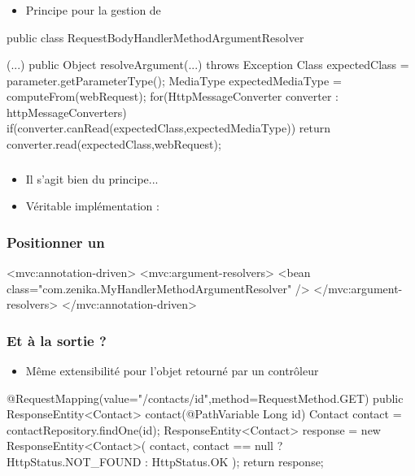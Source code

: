 \begin{frame}[fragile]
 \frametitle{}
 \begin{itemize}
  \item Principe pour la gestion de 
 \end{itemize}
 \begin{javacode}
public class RequestBodyHandlerMethodArgumentResolver {
  (...)
  public Object resolveArgument(...) throws Exception {
    Class expectedClass = parameter.getParameterType();
    MediaType expectedMediaType = computeFrom(webRequest);
    for(HttpMessageConverter converter : httpMessageConverters) {
      if(converter.canRead(expectedClass,expectedMediaType)) {
        return converter.read(expectedClass,webRequest);
      }      
    }
  }

}
 \end{javacode}

\end{frame}

\begin{frame}[fragile]
 \frametitle{}
 \begin{itemize}
  \item Il s'agit bien du principe...
  \item Véritable implémentation : 
 \end{itemize}
\end{frame}

\begin{frame}[fragile]
 \frametitle{Positionner un }
 
 \begin{xmlcode}
<mvc:annotation-driven>
  <mvc:argument-resolvers>
    <bean class="com.zenika.MyHandlerMethodArgumentResolver" />
  </mvc:argument-resolvers>
</mvc:annotation-driven>
 \end{xmlcode}

\end{frame}

\begin{frame}[fragile]
 \frametitle{Et à la sortie ?}
 
 \begin{itemize}
  \item Même extensibilité pour l'objet retourné par un contrôleur
 \end{itemize}
 
 \begin{javacode}
@RequestMapping(value="/contacts/{id}",method=RequestMethod.GET)
public ResponseEntity<Contact> contact(@PathVariable Long id) {	
  Contact contact = contactRepository.findOne(id);
  ResponseEntity<Contact> response = new ResponseEntity<Contact>(
    contact,
    contact == null ? HttpStatus.NOT_FOUND : HttpStatus.OK
  );
  return response;
}
 \end{javacode}

\end{frame}

